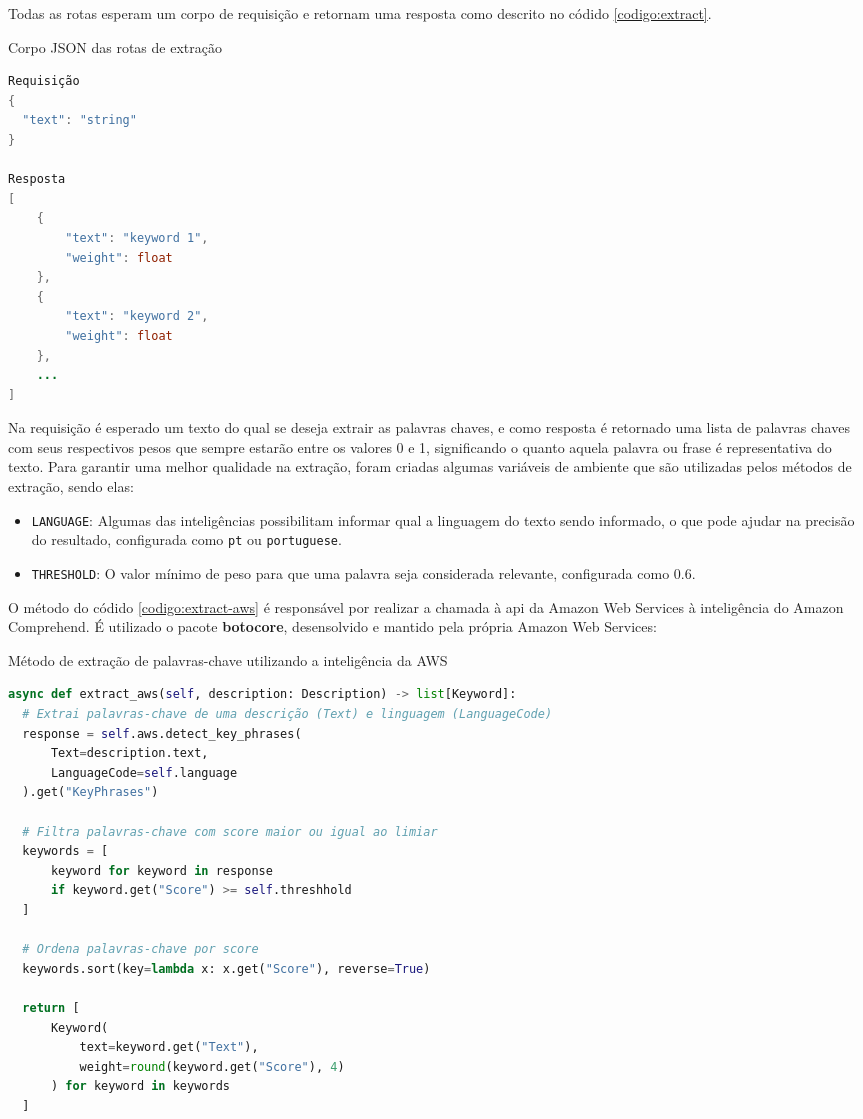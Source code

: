 Todas as rotas esperam um corpo de requisição e retornam uma resposta como descrito no códido \ref{codigo:extract}.

\begin{sourcecode}[htb]
  \caption{\label{codigo:extract}Corpo JSON das rotas de extração}
  \begin{lstlisting}[frame=single, language=Java]
Requisição
{
  "text": "string"
}

Resposta
[
	{
		"text": "keyword 1",
		"weight": float
	},
	{
		"text": "keyword 2",
		"weight": float
	},
	...
]
\end{lstlisting}
  \fonte{}
\end{sourcecode}

Na requisição é esperado um texto do qual se deseja extrair as palavras chaves, e como resposta é retornado uma lista de palavras chaves com seus respectivos pesos que sempre estarão entre os valores 0 e 1, significando o quanto aquela palavra ou frase é representativa do texto. Para garantir uma melhor qualidade na extração, foram criadas algumas variáveis de ambiente que são utilizadas pelos métodos de extração, sendo elas:

\begin{itemize}
  \item \texttt{LANGUAGE}: Algumas das inteligências possibilitam informar qual a linguagem do texto sendo informado, o que pode ajudar na precisão do resultado, configurada como \texttt{pt} ou \texttt{portuguese}.
  \item \texttt{THRESHOLD}: O valor mínimo de peso para que uma palavra seja considerada relevante, configurada como 0.6.
\end{itemize}

O método do códido \ref{codigo:extract-aws} é responsável por realizar a chamada à \gls{api} da Amazon Web Services à inteligência do Amazon Comprehend. É utilizado o pacote \textbf{botocore}, desensolvido e mantido pela própria Amazon Web Services:

\begin{sourcecode}[htb]
  \caption{\label{codigo:extract-aws}Método de extração de palavras-chave utilizando a inteligência da AWS}
  \begin{lstlisting}[frame=single, language=Python]
async def extract_aws(self, description: Description) -> list[Keyword]:
  # Extrai palavras-chave de uma descrição (Text) e linguagem (LanguageCode)
  response = self.aws.detect_key_phrases(
      Text=description.text, 
      LanguageCode=self.language
  ).get("KeyPhrases")

  # Filtra palavras-chave com score maior ou igual ao limiar
  keywords = [
      keyword for keyword in response 
      if keyword.get("Score") >= self.threshhold
  ]

  # Ordena palavras-chave por score
  keywords.sort(key=lambda x: x.get("Score"), reverse=True)

  return [
      Keyword(
          text=keyword.get("Text"), 
          weight=round(keyword.get("Score"), 4)
      ) for keyword in keywords
  ]
\end{lstlisting}
  \fonte{}
\end{sourcecode}

